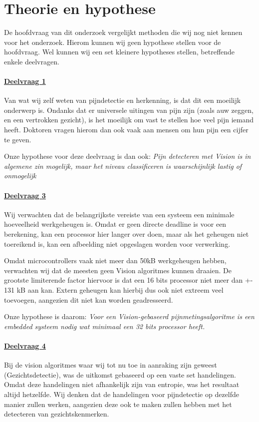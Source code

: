 \documentclass[11pt]{article}
\begin{document}
    \section{Theorie en hypothese}
    De hoofdvraag van dit onderzoek vergelijkt methoden die wij nog niet kennen voor het onderzoek. Hierom kunnen wij geen hypothese stellen voor de hoofdvraag.
    Wel kunnen wij een set kleinere hypotheses stellen, betreffende enkele deelvragen.

    \paragraph{\hyperref[itm:dv1]{Deelvraag 1}}
    Van wat wij zelf weten van pijndetectie en herkenning, is dat dit een moeilijk onderwerp is.
    Ondanks dat er universele uitingen van pijn zijn (zoals auw zeggen, en een vertrokken gezicht), is het moeilijk om vast te stellen hoe veel pijn iemand heeft.
    Doktoren vragen hierom dan ook vaak aan mensen om hun pijn een cijfer te geven.

    Onze hypothese voor deze deelvraag is dan ook:  \emph{Pijn detecteren met Vision is in algemene zin mogelijk, maar het niveau classificeren is waarschijnlijk lastig of onmogelijk}

    \paragraph{\hyperref[itm:dv3]{Deelvraag 3}}
    Wij verwachten dat de belangrijkste vereiste van een systeem een minimale hoeveelheid werkgeheugen is.
    Omdat er geen directe deadline is voor een berekening, kan een processor hier langer over doen, maar als het geheugen niet toereikend is, kan een afbeelding niet opgeslagen worden voor verwerking.

    Omdat microcontrollers vaak niet meer dan 50kB werkgeheugen hebben, verwachten wij dat de meesten geen Vision algoritmes kunnen draaien.
    De grootste limiterende factor hiervoor is dat een 16 bits processor niet meer dan +- 131 kB aan kan.
    Extern geheugen kan hierbij dus ook niet extreem veel toevoegen, aangezien dit niet kan worden geadresseerd.

    Onze hypothese is daarom: \emph{Voor een Vision-gebaseerd pijnmetingsalgoritme is een embedded systeem nodig wat minimaal een 32 bits processor heeft.}

    \paragraph{\hyperref[itm:dv4]{Deelvraag 4}}
    Bij de vision algoritmes waar wij tot nu toe in aanraking zijn geweest (Gezichtsdetectie), was de uitkomst gebaseerd op een vaste set handelingen.
    Omdat deze handelingen niet afhankelijk zijn van entropie, was het resultaat altijd hetzelfde.
    Wij denken dat de handelingen voor pijndetectie op dezelfde manier zullen werken, aangezien deze ook te maken zullen hebben met het detecteren van gezichtskenmerken.
\end{document}
